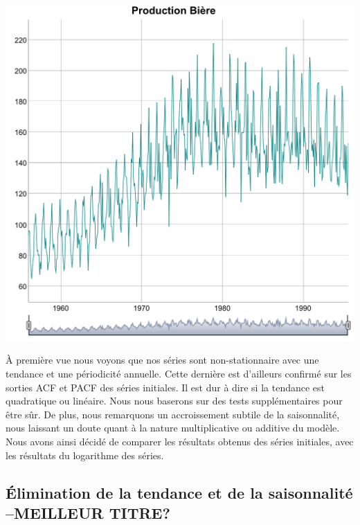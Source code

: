 \documentclass[12pt,a4paper]{book}
\newcommand{\1}{\mathds{1}}
\begin{document}
\begin{center}
	
    \includegraphics[scale=0.4]{plot_beer}  
	\vspace{1 cm}
	
\end{center}

À première vue nous voyons que nos séries sont non-stationnaire avec une tendance et une périodicité annuelle. Cette dernière est d'ailleurs confirmé sur les sorties ACF et PACF des séries initiales. Il est dur à dire si la tendance est quadratique ou linéaire. Nous nous baserons sur des tests supplémentaires pour être sûr.  De plus, nous remarquons un accroissement subtile de la saisonnalité, nous laissant un doute quant à la nature multiplicative ou additive du modèle. Nous avons ainsi décidé de comparer les résultats obtenus des séries initiales, avec les résultats du logarithme des séries. 


\vspace{5 mm}
\subsection{Élimination de la tendance et de la saisonnalité --MEILLEUR TITRE?}
\end{document}
